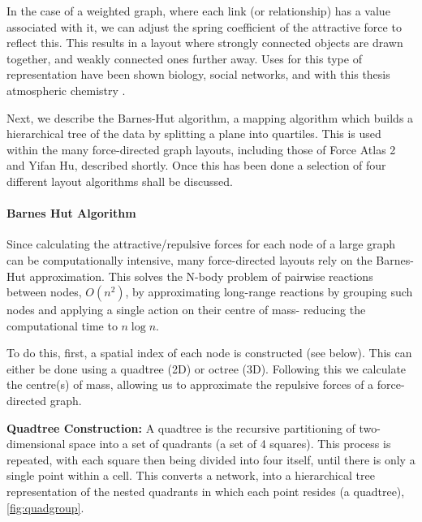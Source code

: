 In the case of a weighted graph, where each link (or relationship) has a value associated with it, we can adjust the spring coefficient of the attractive force to reflect this. This results in a layout where strongly connected objects are drawn together, and weakly connected ones further away. Uses for this type of representation have been shown biology, social networks, and with this thesis atmospheric chemistry \citep{ch3,ch4}.

Next, we describe the Barnes-Hut algorithm, a mapping algorithm which builds a hierarchical tree of the data by splitting a plane into quartiles. This is used within the many force-directed graph layouts, including those of Force Atlas 2 and Yifan Hu, described shortly. Once this has been done a selection of four different layout algorithms shall be discussed.


\paragraph*{Barnes Hut Algorithm}
Since calculating the attractive/repulsive forces for each node of a large graph can be computationally intensive, many force-directed layouts rely on the Barnes-Hut approximation. This solves the N-body problem of pairwise reactions between nodes, $O(n^2)$, by approximating long-range reactions by grouping such nodes and applying a single action on their centre of mass- reducing the computational time to $n \log n$.

To do this, first, a spatial index of each node is constructed (see below). This can either be done using a quadtree (2D) or octree (3D). Following this we calculate the centre(s) of mass, allowing us to approximate the repulsive forces of a force-directed graph.

\textbf{Quadtree Construction:}
A quadtree is the recursive partitioning of two-dimensional space into a set of quadrants (a set of 4 squares). This process is repeated, with each square then being divided into four itself, until there is only a single point within a cell. This converts a network, into a hierarchical tree representation of the nested quadrants in which each point resides (a quadtree), \autoref{fig:quadgroup}.


